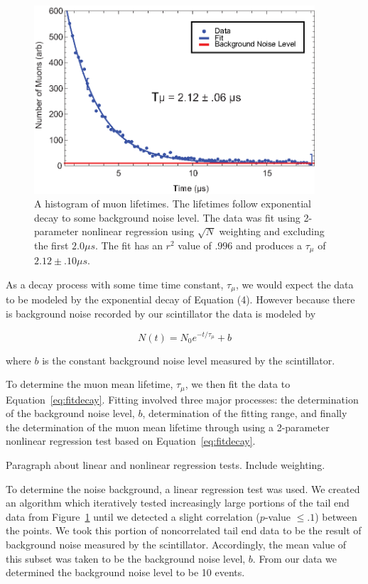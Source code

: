 \begin{figure}[htbp]
\begin{center}
\includegraphics[height=70mm]{./figures/muon_decay.eps}
\caption{A histogram of muon lifetimes. The lifetimes follow exponential decay to some background noise level.  The data was fit using 2-parameter nonlinear regression using $\sqrt{N}$ weighting and excluding the first $2.0 \mu s$.  The fit has an $r^{2}$ value of $.996$ and produces a $\tau_{\mu}$ of $2.12 \pm .10 \mu s$.}
\label{fig:muondecay}
\end{center}
\end{figure}

 As a decay process with some time time constant, $\tau_{\mu}$, we
would expect the data to be modeled by the exponential decay of Equation
(4).  However because there is background noise recorded by our
scintillator the data is modeled by

\begin{equation}
\label{eq:fitdecay}
N(t) = N_{0} e^{-t/\tau_{\mu}}+b
\end{equation}

where $b$ is the constant background noise level measured by the scintillator. 

To determine the muon mean lifetime, $\tau_{\mu}$, we then fit the
data to Equation~\eqref{eq:fitdecay}.  Fitting involved three major processes: the
determination of the background noise level, $b$, determination of the
fitting range, and finally the determination of the muon mean lifetime
through using a 2-parameter nonlinear regression test based on Equation~\eqref{eq:fitdecay}.

Paragraph about linear and nonlinear regression tests. Include weighting.

To determine the noise background, a linear regression test was used.
We created an algorithm which iteratively tested increasingly large
portions of the tail end data from Figure~\ref{fig:muondecay} until we detected a
slight correlation ($p$-value $\leq .1$) between the points.  We took
this portion of noncorrelated tail end data to be the result of
background noise measured by the scintillator.  Accordingly, the mean
value of this subset was taken to be the background noise level,
$b$. From our data we determined the background noise level to be 10
events.

